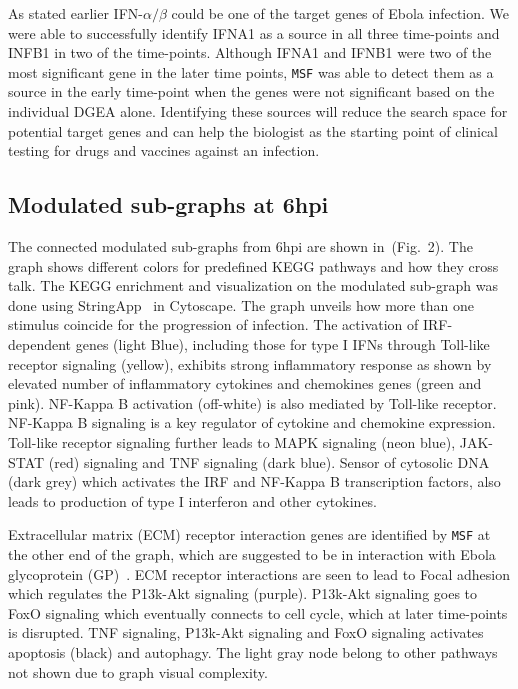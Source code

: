 \documentclass[twocolumn]{article}
\begin{document}
As stated earlier IFN-$\alpha / \beta$ could be one of the target
genes of Ebola infection. We were able to successfully identify IFNA1
as a source in all three time-points and INFB1 in two of the time-points. Although IFNA1 and IFNB1 were two of the most
significant gene in the later time points, \texttt{MSF} was able to detect them as
a source in the early time-point when the genes were not significant
based on the individual DGEA alone. Identifying these sources will reduce the search space for potential target genes and can help the biologist as the starting point of clinical testing for drugs and vaccines against an infection.

\subsection*{Modulated sub-graphs at 6hpi}

 The connected modulated sub-graphs from 6hpi are shown in~(Fig.~2). The graph shows different colors for predefined KEGG pathways and how they cross talk. The KEGG enrichment and visualization on the modulated sub-graph was done using StringApp~\cite{StringApp} in Cytoscape. The graph unveils how more than one stimulus coincide for the progression of infection. The activation of IRF-dependent genes (light Blue), including those for type I IFNs through Toll-like receptor signaling (yellow), exhibits strong inflammatory response as shown by elevated number of inflammatory cytokines and chemokines genes (green and pink). NF-Kappa B activation (off-white) is also mediated by Toll-like receptor. NF-Kappa B signaling is a key regulator of cytokine and chemokine expression\cite{Olejnik}. Toll-like receptor signaling further leads to  MAPK signaling (neon blue), JAK-STAT (red) signaling and TNF signaling (dark blue). Sensor of cytosolic DNA (dark grey) which activates the IRF and NF-Kappa B transcription factors, also leads to production of type I interferon and other cytokines. 
 
 Extracellular matrix (ECM) receptor interaction genes are identified by \texttt{MSF} at the other end of the graph, which are suggested to be in interaction with Ebola glycoprotein (GP)~\cite{Veljkovic}. ECM receptor interactions are seen to lead to Focal adhesion which regulates the P13k-Akt signaling (purple). P13k-Akt signaling goes to FoxO signaling which eventually connects to cell cycle, which at later time-points is disrupted. TNF signaling, P13k-Akt signaling and FoxO signaling activates apoptosis (black) and autophagy. The light gray node belong to other pathways not shown due to graph visual complexity.
\end{document}
